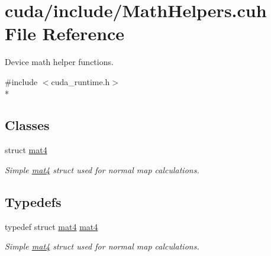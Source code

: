 \hypertarget{MathHelpers_8cuh}{\section{cuda/include/\-Math\-Helpers.cuh File Reference}
\label{MathHelpers_8cuh}
}


Device math helper functions.  


{\ttfamily \#include $<$cuda\-\_\-runtime.\-h$>$}\\*
\subsection*{Classes}
\begin{DoxyCompactItemize}
\item 
struct \hyperlink{structmat4}{mat4}
\begin{DoxyCompactList}\small\item\em Simple \hyperlink{structmat4}{mat4} struct used for normal map calculations. \end{DoxyCompactList}\end{DoxyCompactItemize}
\subsection*{Typedefs}
\begin{DoxyCompactItemize}
\item 
\hypertarget{MathHelpers_8cuh_a31bcd5c31fc67c7eaa2e81d722d2fcff}{typedef struct \hyperlink{structmat4}{mat4} \hyperlink{MathHelpers_8cuh_a31bcd5c31fc67c7eaa2e81d722d2fcff}{mat4}}\label{MathHelpers_8cuh_a31bcd5c31fc67c7eaa2e81d722d2fcff}

\begin{DoxyCompactList}\small\item\em Simple \hyperlink{structmat4}{mat4} struct used for normal map calculations. \end{DoxyCompactList}\end{DoxyCompactItemize}
